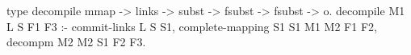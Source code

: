 \begin{elpicode}
  type decompile mmap -> links -> subst ->
    fsubst -> fsubst -> o.
  decompile M1 L S F1 F3 :- 
    commit-links L S S1,
    complete-mapping S1 S1 M1 M2 F1 F2,
    decompm M2 M2 S1 F2 F3.
\end{elpicode}
